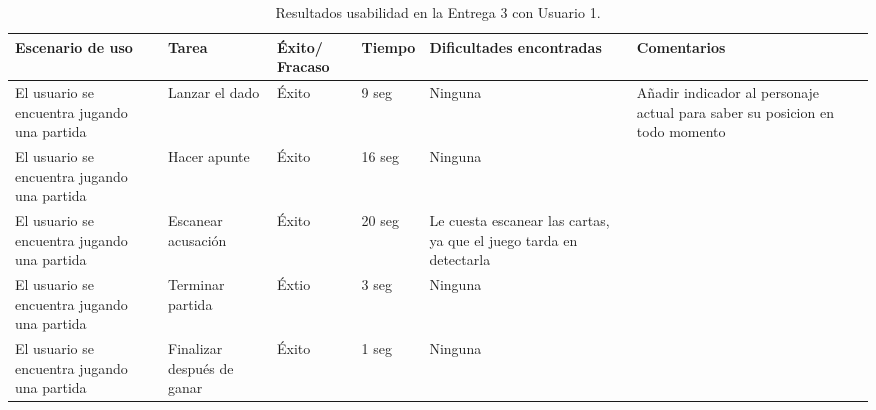 \begin{table}[h]
  \begin{center}
    \begin{tabular}{|p{2.5cm}|p{1.75cm}|p{1.25cm}|p{1.25cm}|p{2.75cm}|p{3.5cm}|}

      \hline
        \rowcolor{Gray} \textbf{Escenario de uso}
        & \textbf{Tarea}
        & \textbf{Éxito/ Fracaso}
        & \textbf{Tiempo}
        & \textbf{Dificultades encontradas}
        & \textbf{Comentarios}\\

      \hline
      El usuario se encuentra jugando una partida
      & Lanzar el dado
      & Éxito
      & 9 seg
      & Ninguna
      & Añadir indicador al personaje actual para saber su posicion en todo momento\\

      \hline
      El usuario se encuentra jugando una partida
      & Hacer apunte
      & Éxito
      & 16 seg
      & Ninguna
      &\\

      \hline
      El usuario se encuentra jugando una partida
      & Escanear acusación
      & Éxito
      & 20 seg
      & Le cuesta escanear las cartas, ya que el juego tarda en detectarla
      &\\

      \hline
      El usuario se encuentra jugando una partida
      & Terminar partida
      & Éxtio
      & 3 seg
      & Ninguna
      &\\

      \hline
      El usuario se encuentra jugando una partida
      & Finalizar después de ganar
      & Éxito
      & 1 seg
      & Ninguna
      &\\

      \hline

    \end{tabular}

    \caption{Resultados usabilidad en la Entrega 3 con Usuario 1.}
    \label{tabla-entrega-3-usuario1}

  \end{center}
\end{table}


